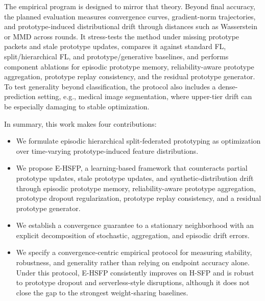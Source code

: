 The empirical program is designed to mirror that theory. Beyond final accuracy, the planned evaluation measures convergence curves, gradient-norm trajectories, and prototype-induced distributional drift through distances such as Wasserstein or MMD across rounds. It stress-tests the method under missing prototype packets and stale prototype updates, compares it against standard FL, split/hierarchical FL, and prototype/generative baselines, and performs component ablations for episodic prototype memory, reliability-aware prototype aggregation, prototype replay consistency, and the residual prototype generator. To test generality beyond classification, the protocol also includes a dense-prediction setting, e.g., medical image segmentation, where upper-tier drift can be especially damaging to stable optimization.

In summary, this work makes four contributions:
\begin{itemize}
    \item We formulate episodic hierarchical split-federated prototyping as optimization over time-varying prototype-induced feature distributions.
    \item We propose E-HSFP, a learning-based framework that counteracts partial prototype updates, stale prototype updates, and synthetic-distribution drift through episodic prototype memory, reliability-aware prototype aggregation, prototype dropout regularization, prototype replay consistency, and a residual prototype generator.
    \item We establish a convergence guarantee to a stationary neighborhood with an explicit decomposition of stochastic, aggregation, and episodic drift errors.
    \item We specify a convergence-centric empirical protocol for measuring stability, robustness, and generality rather than relying on endpoint accuracy alone. Under this protocol, E-HSFP consistently improves on H-SFP and is robust to prototype dropout and serverless-style disruptions, although it does not close the gap to the strongest weight-sharing baselines.
\end{itemize} 
